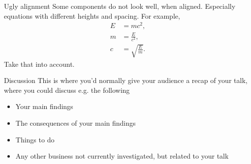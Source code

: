 \documentclass{beamer}
\begin{document}
\begin{frame}{Ugly alignment}
Some components do not look well, when aligned. Especially equations with different heights and spacing. For example,
\begin{align}
    E&=mc^2,\\
    m&=\frac{E}{c^2},\\
    c&=\sqrt{\frac{E}{m}}.
\end{align}
Take that into account.
\end{frame}

\begin{frame}{Discussion}
This is where you'd normally give your audience a recap of your talk, where you could discuss e.g. the following
\begin{itemize}
    \item Your main findings
    \item The consequences of your main findings
    \item Things to do
    \item Any other business not currently investigated, but related to your talk 
\end{itemize}
    
\end{frame}
\end{document}
